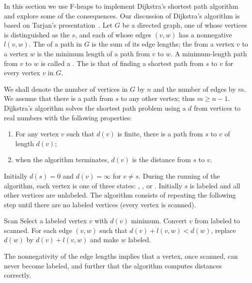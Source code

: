 In this section we use F-heaps to implement Dijkstra's shortest path algorithm~%
\cite{Dijkstra1959} and explore some of the consequences. Our discussion of
Dijkstra's algorithm is based on Tarjan's presentation~\cite{Tarjan1983}. Let \(G\)
be a directed graph, one of whose vertices is distinguished as the 
\(s\), and each of whose edges \((v, w)\) has a nonnegative  \(l(v,
w)\). The  of a path in \(G\) is the sum of its edge lengths; the
 from a vertex \(v\) to a vertex \(w\) is the minimum length of a path
from \(v\) to \(w\). A minimum-length path from \(v\) to \(w\) is called
a . The  is that of
finding a shortest path from \(s\) to \(v\) for every vertex \(v\) in \(G\).

We shall denote the number of vertices in \(G\) by \(n\) and the number of edges by
\(m\). We assume that there is a path from \(s\) to any other vertex; thus \(m \geq
n - 1\). Dijkstra's algorithm solves the shortest path problem using
a  \(d\) from vertices to real numbers with the
following properties:
\begin{enumerate}
    \item For any vertex \(v\) such that \(d(v)\) is finite, there is a path from
        \(s\) to \(v\) of length \(d(v)\);
    \item when the algorithm terminates, \(d(v)\) is the distance from \(s\) to
    \(v\).
\end{enumerate}

Initially \(d(s) = 0\) and \(d(v) = \infty\) for \(v \neq s\). During the running of the algorithm, each vertex is one of three states: , , or . Initially \(s\) is labeled and all other vertices are unlabeled. The algorithm consists of repeating the following step until there are no labeled vertices (every vertex is scanned).

\begin{step}{Scan}
    Select a labeled vertex \(v\) with \(d(v)\) minimum. Convert \(v\) from labeled
    to scanned. For each edge \((v, w)\) such that \(d(v) + l(v, w) < d(w)\), replace
    \(d(w)\) by \(d(v) + l(v, w)\) and make \(w\) labeled.
\end{step}

The nonnegativity of the edge lengths implies that a vertex, once scanned, can never
become labeled, and further that the algorithm computes distances correctly.

